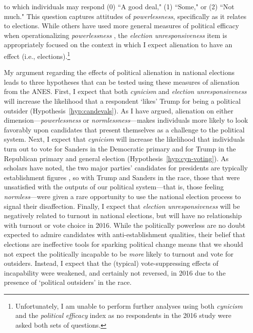 \documentclass[12pt]{article}
\begin{document}
\noindent to which individuals may respond (0) ``A good deal," (1) ``Some," or (2) ``Not much." This question captures attitudes of \textit{powerlessness}, specifically as it relates to elections. While others have used more general measures of political efficacy when operationalizing \textit{powerlessness} \parencite[e.g.,][]{aberbach1969alienation}, the \textit{election unresponsiveness} item is appropriately focused on the context in which I expect alienation to have an effect (i.e., elections).\footnote{Unfortunately, I am unable to perform further analyses using both \textit{cynicism} and the \textit{political efficacy} index as no respondents in the 2016 study were asked both sets of questions.}

My argument regarding the effects of political alienation in national elections leads to three hypotheses that can be tested using these measures of alienation from the ANES. First, I expect that both \textit{cynicism} and \textit{election unresponsiveness} will increase the likelihood that a respondent `likes' Trump for being a political outsider (Hypothesis~\ref{hyp:candevals}). As I have argued, alienation on either dimension---\textit{powerlessness} or \textit{normlessness}---makes individuals more likely to look favorably upon candidates that present themselves as a challenge to the political system. Next, I expect that \textit{cynicism} will increase the likelihood that individuals turn out to vote for Sanders in the Democratic primary and for Trump in the Republican primary and general election (Hypothesis~\ref{hyp:cyn-voting}).  As scholars have noted, the two major parties' candidates for presidents are typically establishment figures \parencite{templeton1966}, so with Trump and Sanders in the race, those that were unsatisfied with the outputs of our political system---that is, those feeling \textit{normless}---were given a rare opportunity to use the national election process to signal their disaffection. Finally, I expect that \textit{election unresponsiveness} will be negatively related to turnout in national elections, but will have no relationship with turnout or vote choice in 2016. While the politically powerless are no doubt expected to admire candidates with anti-establishment qualities, their belief that elections are ineffective tools for sparking political change means that we should not expect the politically incapable to be \textit{more} likely to turnout and vote for outsiders. Instead, I expect that the (typical) vote-suppressing effects of incapability were weakened, and certainly not reversed, in 2016 due to the presence of `political outsiders' in the race. 
\end{document}
